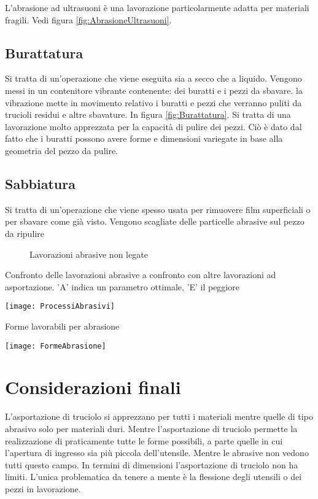 L'abrasione ad ultrasuoni è una lavorazione particolarmente adatta per materiali fragili.
Vedi figura \ref{fig:AbrasioneUltrasuoni}.

\subsection{Burattatura}
Si tratta di un'operazione che viene eseguita sia a secco che a liquido.
Vengono messi in un contenitore vibrante contenente: dei buratti e i pezzi da sbavare. la vibrazione mette in movimento relativo i buratti e pezzi che verranno puliti da trucioli residui e altre sbavature.
In figura \ref{fig:Burattatura}.
Si tratta di una lavorazione molto apprezzata per la capacità di pulire dei pezzi. Ciò è dato dal fatto che i buratti possono avere forme e dimensioni variegate in base alla geometria del pezzo da pulire.

\subsection{Sabbiatura}
Si tratta di un'operazione che viene spesso usata per rimuovere film superficiali o per sbavare come già visto.
Vengono scagliate delle particelle abrasive sul pezzo da ripulire

\begin{figure}
\centering
{}\quad
{}\quad
{}
\caption{Lavorazioni abrasive non legate}
\label{fig:NonLegate}
\end{figure}


\begin{table}
\centering
\caption{Confronto delle lavorazioni abrasive a confronto con altre lavorazioni ad asportazione. 'A' indica un parametro ottimale, 'E' il peggiore}
\label{tab:ProcessiAbrasivi}
\texttt{[image: ProcessiAbrasivi]}
\caption{Forme lavorabili per abrasione}
\label{fig:FormeAbrasione}
\texttt{[image: FormeAbrasione]}
\end{table}


\section{Considerazioni finali}
L'asportazione di truciolo si apprezzano per tutti i materiali mentre quelle di tipo abrasivo solo per materiali duri.
Mentre l'asportazione di truciolo permette la realizzazione di praticamente tutte le forme possibili, a parte quelle in cui l'apertura di ingresso sia più piccola dell'utensile. Mentre le abrasive non vedono tutti questo campo.
In termini di dimensioni l'asportazione di truciolo non ha limiti. L'unica problematica da tenere a mente è la flessione degli utensili o dei pezzi in lavorazione.


